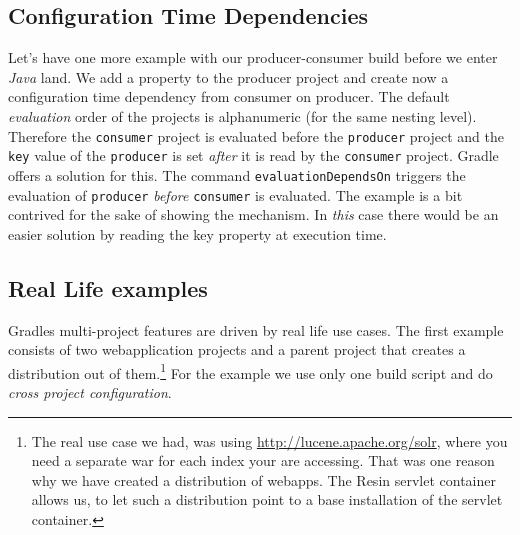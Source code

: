 \subsection{Configuration Time Dependencies} %
\label{sub:configuration_time_dependencies}
Let's have one more example with our producer-consumer build before we enter \emph{Java} land. We add a property to the producer project and create now a configuration time dependency from consumer on producer. 
The default \emph{evaluation} order of the projects is alphanumeric (for the same nesting level). Therefore the \texttt{consumer} project is evaluated before the \texttt{producer} project and the \texttt{key} value of the \texttt{producer} is set \emph{after} it is read by the \texttt{consumer} project. Gradle offers a solution for this. 
The command \texttt{evaluationDependsOn} triggers the evaluation of \texttt{producer} \emph{before} \texttt{consumer} is evaluated.
The example is a bit contrived for the sake of showing the mechanism. In \emph{this} case there would be an easier solution by reading the key property at execution time.

\subsection{Real Life examples} %
\label{sub:real_life_examples}
Gradles multi-project features are driven by real life use cases. The first example consists of two webapplication projects and a parent project that creates a distribution out of them.\footnote{The real use case we had, was using \url{http://lucene.apache.org/solr}, where you need a separate war for each index your are accessing. That was one reason why we have created a distribution of webapps. The Resin servlet container allows us, to let such a distribution point to a base installation of the servlet container.} For the example we use only one build script and do \emph{cross project configuration}.

